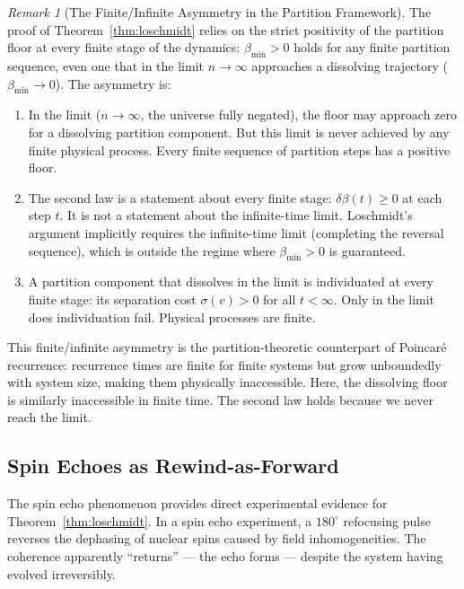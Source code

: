 \documentclass[11pt,twocolumn,a4paper]{article}
\theoremstyle{plain}
\theoremstyle{definition}
\theoremstyle{remark}
\newtheorem{remark}[theorem]{Remark}
\newcommand{\bmin}{\beta_{\min}}
\begin{document}
\begin{remark}[The Finite/Infinite Asymmetry in the Partition Framework]
\label{rem:finite_infinite}
The proof of Theorem~\ref{thm:loschmidt} relies on the strict positivity of the
partition floor at every finite stage of the dynamics: $\bmin > 0$ holds for any
finite partition sequence, even one that in the limit $n \to \infty$ approaches
a dissolving trajectory ($\bmin \to 0$). The asymmetry is:

\begin{enumerate}[label=(\roman*)]
  \item In the limit ($n \to \infty$, the universe fully negated), the floor
  may approach zero for a dissolving partition component. But this limit is
  never achieved by any finite physical process. Every finite sequence of
  partition steps has a positive floor.

  \item The second law is a statement about every finite stage: $\delta\beta(t)
  \geq 0$ at each step $t$. It is not a statement about the infinite-time limit.
  Loschmidt's argument implicitly requires the infinite-time limit (completing
  the reversal sequence), which is outside the regime where $\bmin > 0$ is
  guaranteed.

  \item A partition component that dissolves in the limit is individuated at
  every finite stage: its separation cost $\sigma(v) > 0$ for all $t < \infty$.
  Only in the limit does individuation fail. Physical processes are finite.
\end{enumerate}

This finite/infinite asymmetry is the partition-theoretic counterpart of Poincaré
recurrence: recurrence times are finite for finite systems but grow unboundedly
with system size, making them physically inaccessible. Here, the dissolving
floor is similarly inaccessible in finite time. The second law holds because
we never reach the limit.
\end{remark}

\subsection{Spin Echoes as Rewind-as-Forward}

The spin echo phenomenon \citep{hahn1950,carr1954} provides direct experimental
evidence for Theorem~\ref{thm:loschmidt}. In a spin echo experiment, a $180^\circ$
refocusing pulse reverses the dephasing of nuclear spins caused by field
inhomogeneities. The coherence apparently ``returns'' --- the echo forms ---
despite the system having evolved irreversibly.
\end{document}
